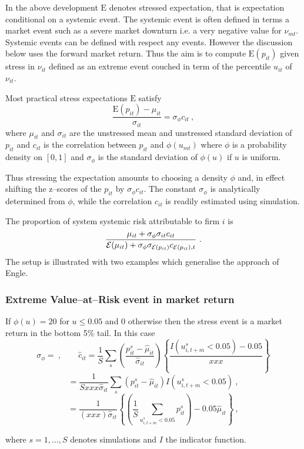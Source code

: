 \documentclass[authoryear]{elsarticle}
\newcommand{\E}{\mathrm{E}}
\newcommand{\Ex}{{\cal E}}
\newcommand{\cq}{\ , \qquad}
\newcommand{\be}[1]{\begin{equation}\label{#1}}
\newcommand{\ee}{\end{equation}}
\begin{document}
In the above development $\E$  denotes  stressed expectation, that is expectation conditional on a systemic event.   The systemic event is often defined in terms a market event such as a severe market downturn i.e. a very negative value for  $\nu_{mt}$.   Systemic events can be defined with respect any events.   However the discussion below uses the forward market return.  Thus the aim is to compute $\E(p_{it})$ given stress in $\nu_{it}$ defined as an extreme event couched in term of the percentile $u_{it}$ of $\nu_{it}$.

Most practical stress expectations $\E$ satisfy
\be{formula}
\frac{\E(p_{it})-\mu_{it}}{\sigma_{it}} =\sigma_\phi c_{it}\ ,
\ee
where $\mu_{it}$ and $\sigma_{it}$ are the unstressed mean and unstressed standard deviation of $p_{it}$ and $c_{it}$ is the correlation between $p_{it}$ and $\phi(u_{mt})$ where $\phi$ is a probability density on $[0,1]$ and  $\sigma_\phi$ is the standard deviation of $\phi(u)$ if  $u$ is uniform.     

Thus stressing the expectation amounts to choosing a density $\phi$ and, in effect shifting the z--scores of the $p_{it}$  
by  $\sigma_\phi c_{it}$.  The constant $\sigma_\phi$ is analytically determined from $\phi$, while the correlation $c_{it}$  is  readily estimated using simulation.  

 The proportion of system systemic risk attributable to firm $i$ is
$$
\frac{\mu_{it} +\sigma_\phi\sigma_{it}c_{it}}{\Ex(\mu_{it}) +\sigma_\phi\sigma_{\Ex(p_{it})}c_{\Ex(p_{it}),t}}\ .
$$ 
The setup is illustrated with two examples which generalise the approach of Engle.

\subsubsection{Extreme Value--at--Risk event in market return} 

If  $\phi(u)=20$ for $u\le 0.05$ and 0 otherwise then the stress event is a market return in the bottom 5\% tail.   In this case 
$$
\sigma_\phi = \cq \hat c_{it} =\frac{1}{S} \sum_s \left( \frac{p_{it}^s - \hat\mu_{it}}{\hat \sigma_{it}}\right)\left\{\frac{I(u^s_{i,t+m}<0.05)-0.05}{xxx}\right\}
$$$$
=\frac{1}{Sxxx\hat \sigma_{it}} \sum_s \left(p_{it}^s - \hat\mu_{it}\right)I(u^s_{i,t+m}<0.05)\ ,
$$$$
=\frac{1}{(xxx)\hat \sigma_{it}}\left\{\left(\frac{1}{S} \sum_{u^s_{i,t+m}<0.05} p_{it}^s \right)- 0.05\hat\mu_{it}\right\}\ ,
$$

where $s=1,\ldots,S$ denotes simulations and $I$ the indicator function. 
\end{document}
